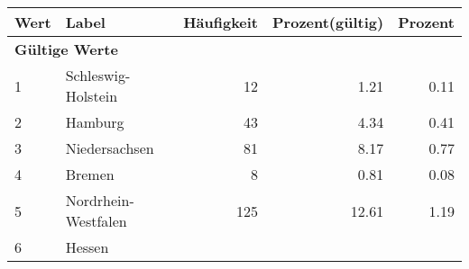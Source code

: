      \begin{longtable}{lXrrr}
     \toprule
     \textbf{Wert} & \textbf{Label} & \textbf{Häufigkeit} & \textbf{Prozent(gültig)} & \textbf{Prozent} \\
     \endhead
     \midrule
     \multicolumn{5}{l}{\textbf{Gültige Werte}}\\

     1 &
     \multicolumn{1}{X}{ Schleswig-Holstein   } &


       \num{12} &
       \num[round-mode=places,round-precision=2]{1.21} &
         \num[round-mode=places,round-precision=2]{0.11} \\

     2 &
     \multicolumn{1}{X}{ Hamburg   } &


       \num{43} &
       \num[round-mode=places,round-precision=2]{4.34} &
         \num[round-mode=places,round-precision=2]{0.41} \\

     3 &
     \multicolumn{1}{X}{ Niedersachsen   } &


       \num{81} &
       \num[round-mode=places,round-precision=2]{8.17} &
         \num[round-mode=places,round-precision=2]{0.77} \\

     4 &
     \multicolumn{1}{X}{ Bremen   } &


       \num{8} &
       \num[round-mode=places,round-precision=2]{0.81} &
         \num[round-mode=places,round-precision=2]{0.08} \\

     5 &
     \multicolumn{1}{X}{ Nordrhein-Westfalen   } &


       \num{125} &
       \num[round-mode=places,round-precision=2]{12.61} &
         \num[round-mode=places,round-precision=2]{1.19} \\

     6 &
     \multicolumn{1}{X}{ Hessen   } &



\end{longtable}
